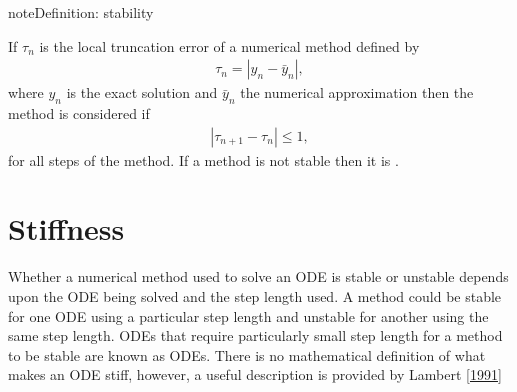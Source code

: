 \documentclass[letterpaper,10pt,english]{jupyterBook}
\begin{document}
\begin{sphinxadmonition}{note}{Definition: stability}

\sphinxAtStartPar
If \(\tau_n\) is the local truncation error of a numerical method defined by
\begin{align*}
    \tau_n = |y_n - \bar{y}_n|,
\end{align*}
\sphinxAtStartPar
where \(y_n\) is the exact solution and \(\bar{y}_n\) the numerical approximation then the method is considered  if
\begin{equation}\label{equation:4_Stability/4.0_Stability:stability-equation}
\begin{split}|\tau_{n+1} - \tau_n | \leq 1,\end{split}
\end{equation}
\sphinxAtStartPar
for all steps of the method. If a method is not stable then it is .
\end{sphinxadmonition}


\section{Stiffness}
\label{\detokenize{4_Stability/4.0_Stability:stiffness}}\label{\detokenize{4_Stability/4.0_Stability:stiffness-section}}
\sphinxAtStartPar
Whether a numerical method used to solve an ODE is stable or unstable depends upon the ODE being solved and the step length used. A method could be stable for one ODE using a particular step length and unstable for another using the same step length. ODEs that require particularly small step length for a method to be stable are known as  ODEs. There is no mathematical definition of what makes an ODE stiff, however, a useful description is provided by Lambert {[}\hyperlink{cite.4_Stability/4.0_Stability:id4}{1991}{]}
\begin{quote}

\sphinxAtStartPar
{}
\end{quote}
\end{document}
